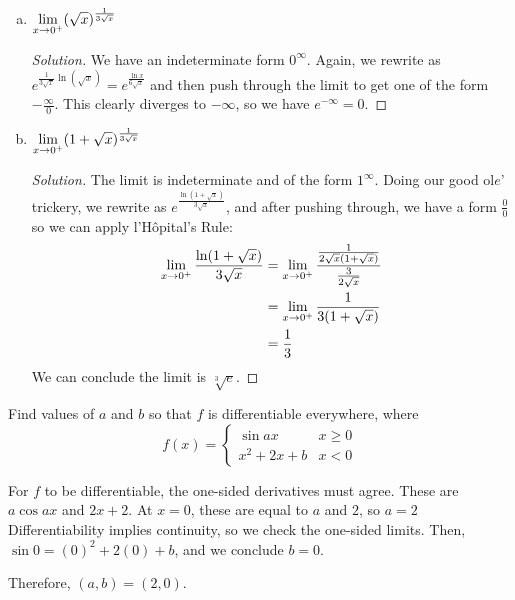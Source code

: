 \begin{prob}
\begin{enumerate}[(a)]
\begin{proof}[Solution]
          \end{proof}
    \item $\displaystyle\lim_{x\to0^+}(\sqrt{x})^{\frac{1}{3\sqrt{x}}}$
          \begin{proof}[Solution]
            We have an indeterminate form $0^\infty$.
            Again, we rewrite as $e^{\frac{1}{3\sqrt{x}}\ln(\sqrt{x})} = e^{\frac{\ln x}{6\sqrt{x}}}$
            and then push through the limit to get one of the form $-\frac{\infty}{0}$.
            This clearly diverges to $-\infty$, so we have $e^{-\infty} = 0$.
          \end{proof}
    \item $\displaystyle\lim_{x\to0^+}(1+\sqrt{x})^{\frac{1}{3\sqrt{x}}}$
          \begin{proof}[Solution]
            The limit is indeterminate and of the form $1^{\infty}$.
            Doing our good ol$e$' trickery, we rewrite as $e^{\frac{\ln(1+\sqrt{x})}{3\sqrt{x}}}$,
            and after pushing through, we have a form $\frac{0}{0}$ so we can apply l'Hôpital's Rule:
            \begin{align*}
              \displaystyle\lim_{x\to0^+} \frac{\ln(1+\sqrt{x})}{3\sqrt{x}}
               & = \displaystyle\lim_{x\to0^+} \frac{\frac{1}{2\sqrt{x}(1+\sqrt{x})}}{\frac{3}{2\sqrt{x}}} \\
               & = \displaystyle\lim_{x\to0^+} \frac{1}{3(1+\sqrt{x})}                                     \\
               & = \frac13
            \end{align*}
            We can conclude the limit is $\sqrt[3]{e}$.
          \end{proof}
  \end{enumerate}
\end{prob}

\begin{prob}
  Find values of $a$ and $b$ so that $f$ is differentiable everywhere, where
  \[ f(x) = \begin{cases}
      \sin ax      & x \geq 0 \\
      x^2 + 2x + b & x < 0
    \end{cases} \]
\end{prob}
\begin{sol}
  For $f$ to be differentiable, the one-sided derivatives must agree.
  These are $a\cos ax$ and $2x + 2$.
  At $x=0$, these are equal to $a$ and $2$, so $a=2$
  Differentiability implies continuity, so we check the one-sided limits.
  Then, $\sin 0 = (0)^2 + 2(0) + b$, and we conclude $b=0$.

  Therefore, $(a,b) = (2,0)$.
\end{sol}

